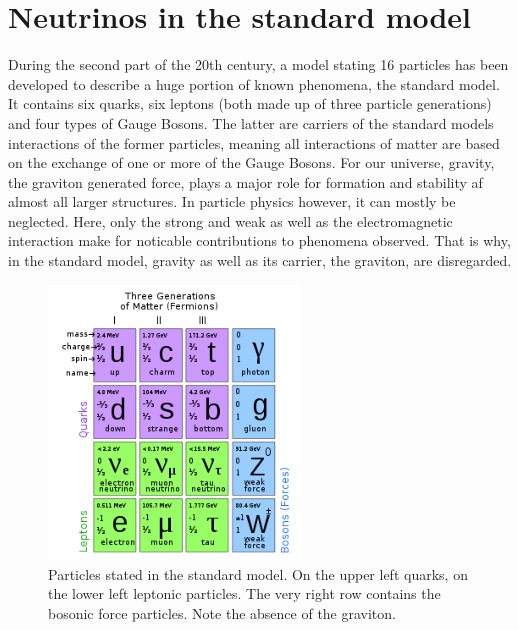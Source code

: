    \section{Neutrinos in the standard model}
    \label{ch:Introduction:sec:Neutrinos in the standard model}
    During the second part of the 20th century, a model stating 16 particles has been developed to describe a huge portion of known phenomena, the standard model. It contains six quarks, six leptons (both made up of three particle generations) and four types of Gauge Bosons. The latter are carriers of the standard models interactions of the former particles, meaning all interactions of matter are based on the exchange of one or more of the Gauge Bosons. 
    For our universe, gravity, the graviton generated force, plays a major role for formation and stability af almost all larger structures. In particle physics however, it can mostly be neglected. Here, only the strong and weak as well as the electromagnetic interaction make for noticable contributions to phenomena observed. That is why, in the standard model, gravity as well as its carrier, the graviton, are disregarded.
    \begin{figure}
    	\centering
    	\includegraphics[width = 0.6\textwidth]{graphics/standardModel/particles.png}
    	\caption[standard model particles]{Particles stated in the standard model. On the upper left quarks, on the lower left leptonic particles. The very right row contains the bosonic force particles. Note the absence of the graviton.\cite{particlesSM}}
    	\label{fig:standardModel:particles}
    \end{figure}
	
